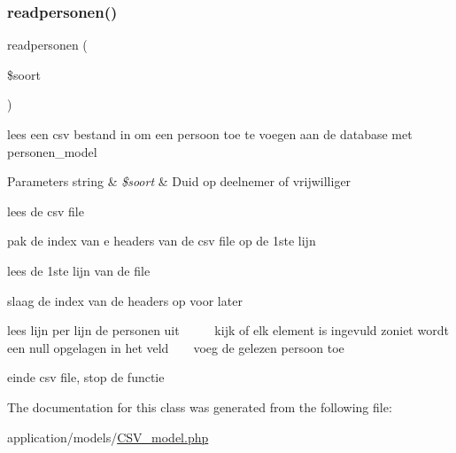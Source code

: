 \subsubsection{\texorpdfstring{readpersonen()}{readpersonen()}}
{\footnotesize\ttfamily readpersonen (\begin{DoxyParamCaption}\item[{}]{\$soort }\end{DoxyParamCaption})}

lees een csv bestand in om een persoon toe te voegen aan de database met personen\+\_\+model 
\begin{DoxyParams}[1]{Parameters}
string & {\em \$soort} & Duid op deelnemer of vrijwilliger \\
\hline
\end{DoxyParams}
lees de csv file

pak de index van e headers van de csv file op de 1ste lijn

lees de 1ste lijn van de file

slaag de index van de headers op voor later

lees lijn per lijn de personen uit ~\newline
~\newline
~\newline
 kijk of elk element is ingevuld zoniet wordt een null opgelagen in het veld ~\newline
~\newline
 voeg de gelezen persoon toe

einde csv file, stop de functie 

The documentation for this class was generated from the following file\+:\begin{DoxyCompactItemize}
\item 
application/models/\mbox{\hyperlink{_c_s_v__model_8php}{C\+S\+V\+\_\+model.\+php}}\end{DoxyCompactItemize}
